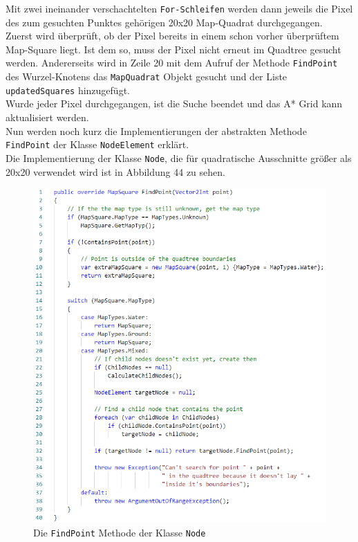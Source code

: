 \documentclass[a4paper,12pt]{article}
\newcommand{\code}{\texttt}
\begin{document}
Mit zwei ineinander verschachtelten \code{For-Schleifen} werden dann jeweils die Pixel des zum gesuchten Punktes gehörigen 20x20 Map-Quadrat durchgegangen.
\\[0.4cm]
Zuerst wird überprüft, ob der Pixel bereits in einem schon vorher überprüftem Map-Square liegt. Ist dem so, muss der Pixel nicht erneut im Quadtree gesucht werden. Andererseits wird in Zeile 20 mit dem Aufruf der Methode \code{FindPoint} des Wurzel-Knotens das \code{MapQuadrat} Objekt gesucht und der Liste \code{updatedSquares} hinzugefügt.
\\[0.4cm]
Wurde jeder Pixel durchgegangen, ist die Suche beendet und das A* Grid kann aktualisiert werden.
\\[0.4cm]
Nun werden noch kurz die Implementierungen der abstrakten Methode \code{FindPoint} der Klasse \code{NodeElement} erklärt.
\\[0.4cm]
Die Implementierung der Klasse \code{Node}, die für quadratische Ausschnitte größer als 20x20 verwendet wird ist in Abbildung 44 zu sehen.
\begin{figure}[H]
    \centering
    \includegraphics[width=1\linewidth]{Bilder/Aufgabe3/Teilaufgabe_C/Quadtree_02.png}
    \caption{Die \code{FindPoint} Methode der Klasse \code{Node}}
\end{figure}
\end{document}
